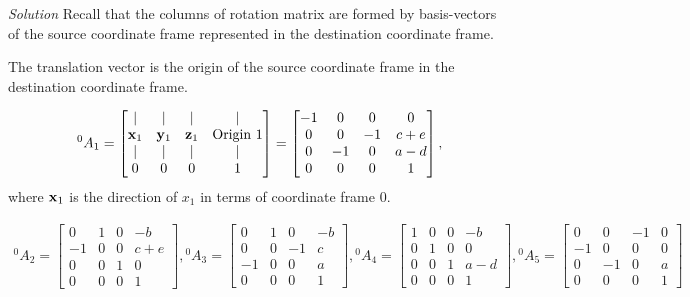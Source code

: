 \documentclass{article}
\numberwithin{prob}{section}
\newenvironment{solution}{\emph{Solution}}{}
\begin{document}
\begin{solution}
Recall that the columns of rotation matrix are formed by basis-vectors of the source coordinate frame represented in the destination coordinate frame.

The translation vector is the origin of the source coordinate frame in the destination coordinate frame.

\begin{align}
  {}^0A_1 = \begin{bmatrix}
    | & | & | & | \\
    \mathbf{x}_1 & \mathbf{y}_1 & \mathbf{z}_1 & \text{Origin 1} \\
    | & | & | & | \\
    0 & 0 & 0 & 1
  \end{bmatrix}
  = \begin{bmatrix}
    -1 & 0 & 0 & 0 \\
    0 & 0 & -1 & c+e\\
    0 & -1 & 0 & a - d\\
    0 & 0 & 0 & 1
  \end{bmatrix}
  ,
\end{align}
where $\mathbf{x}_1$ is the direction of $x_1$ in terms of coordinate frame 0.

\begin{align}
  {}^0A_2 = \begin{bmatrix}
    0  & 1 &  0 & -b \\
    -1 & 0 &  0  & c+e\\
    0  & 0 &  1 & 0\\
    0  & 0 &  0 & 1
  \end{bmatrix}
  ,
  {}^0A_3 = \begin{bmatrix}
     0 & 1 &  0 & -b \\
     0 & 0 & -1  & c\\
    -1 & 0 &  0 &  a \\
     0 & 0 &  0 & 1
  \end{bmatrix}
  ,
  {}^0A_4 = \begin{bmatrix}
     1 & 0 &  0 & -b \\
     0 & 1 &  0 & 0 \\
     0 & 0 &  1 & a-d  \\
     0 & 0 &  0 & 1
  \end{bmatrix}
  ,
  {}^0A_5 = \begin{bmatrix}
     0 &  0 & -1 & 0\\
    -1 &  0 &  0 & 0\\
     0 & -1 &  0 & a\\
     0 &  0 &  0 & 1
  \end{bmatrix}
\end{align}


\end{solution}
\end{document}
